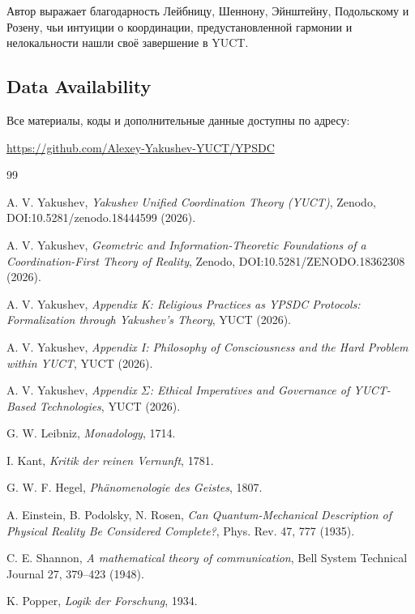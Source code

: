 \documentclass[12pt,a4paper]{article}
\begin{document}
	Автор выражает благодарность Лейбницу, Шеннону, Эйнштейну, Подольскому и Розену, чьи интуиции о координации, предустановленной гармонии и нелокальности нашли своё завершение в YUCT.
	
	\subsection*{Data Availability}
	
	Все материалы, коды и дополнительные данные доступны по адресу:
	\begin{center}
		\url{https://github.com/Alexey-Yakushev-YUCT/YPSDC}
	\end{center}
	
	\begin{thebibliography}{99}
		
		A. V. Yakushev, \emph{Yakushev Unified Coordination Theory (YUCT)}, Zenodo, DOI:10.5281/zenodo.18444599 (2026).
		
		A. V. Yakushev, \emph{Geometric and Information-Theoretic Foundations of a Coordination-First Theory of Reality}, Zenodo, DOI:10.5281/ZENODO.18362308 (2026).
		
		A. V. Yakushev, \emph{Appendix K: Religious Practices as YPSDC Protocols: Formalization through Yakushev's Theory}, YUCT (2026).
		
		A. V. Yakushev, \emph{Appendix I: Philosophy of Consciousness and the Hard Problem within YUCT}, YUCT (2026).
		
		A. V. Yakushev, \emph{Appendix \(\Sigma\): Ethical Imperatives and Governance of YUCT-Based Technologies}, YUCT (2026).
		
		G. W. Leibniz, \emph{Monadology}, 1714.
		
		I. Kant, \emph{Kritik der reinen Vernunft}, 1781.
		
		G. W. F. Hegel, \emph{Phänomenologie des Geistes}, 1807.
		
		A. Einstein, B. Podolsky, N. Rosen, \emph{Can Quantum-Mechanical Description of Physical Reality Be Considered Complete?}, Phys. Rev. 47, 777 (1935).
		
		C. E. Shannon, \emph{A mathematical theory of communication}, Bell System Technical Journal 27, 379--423 (1948).
		
		K. Popper, \emph{Logik der Forschung}, 1934.
		

\end{thebibliography}
\end{document}
